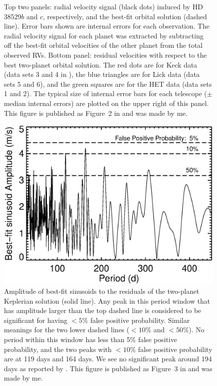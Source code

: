 \begin{figure}
\caption{Top two panels: radial velocity signal (black dots) induced
  by HD 38529$b$ and $c$, respectively, and the best-fit orbital
  solution (dashed line). Error bars shown are internal errors for
  each observation. The radial velocity signal for each planet was
  extracted by subtracting off the best-fit orbital velocities of the
  other planet from the total observed RVs. Bottom panel: residual
  velocities with respect to the best two-planet orbital solution. The
  red dots are for Keck data (data sets 3 and 4 in
  \cite{2013ApJ...768..155H}), the blue triangles are for Lick data
  (data sets 5 and 6), and the green squares are for the HET data
  (data sets 1 and 2). The typical size of internal error bars for
  each telescope ($\pm$ median internal errors) are plotted on the
  upper right of this panel. This figure is published as Figure~2 in
  \cite{2013ApJ...768..155H} and was made by me.
\label{boottran:rvplot}}
\end{figure}


\begin{figure}
\includegraphics[scale=0.6]{boottran/nod.eps} 
\caption{Amplitude of best-fit sinusoids to the residuals of the
  two-planet Keplerian solution (solid line). Any peak in this period
  window that has amplitude larger than the top dashed line is
  considered to be significant for having $<5\%$ false positive
  probability. Similar meanings for the two lower dashed lines
  ($<10\%$ and $<50\%$). No period within this window has less than
  5\% false positive probability, and the two peaks with $<10\%$ false
  positive probability are at 119 days and 164 days. We see no
  significant peak around 194 days as reported by
  \cite{2010AJ....139.1844B}. This figure is published as Figure~3 in
  \cite{2013ApJ...768..155H} and was made by me.
\label{boottran:nod}}
\end{figure}


